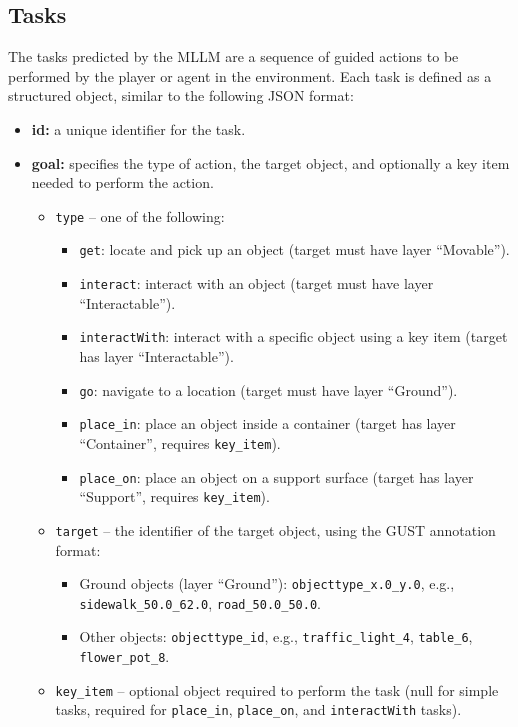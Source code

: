 \documentclass{article}
\begin{document}
\subsection{Tasks}

The tasks predicted by the MLLM are a sequence of guided actions to be performed by the player or agent in the environment. Each task is defined as a structured object, similar to the following JSON format:

\begin{itemize}
    \item \textbf{id:} a unique identifier for the task.
    
    \item \textbf{goal:} specifies the type of action, the target object, and optionally a key item needed to perform the action.
    \begin{itemize}
        \item \texttt{type} -- one of the following:
        \begin{itemize}
            \item \texttt{get}: locate and pick up an object (target must have layer ``Movable'').
            \item \texttt{interact}: interact with an object (target must have layer ``Interactable'').
            \item \texttt{interactWith}: interact with a specific object using a key item (target has layer ``Interactable'').
            \item \texttt{go}: navigate to a location (target must have layer ``Ground'').
            \item \texttt{place\_in}: place an object inside a container (target has layer ``Container'', requires \texttt{key\_item}).
            \item \texttt{place\_on}: place an object on a support surface (target has layer ``Support'', requires \texttt{key\_item}).
        \end{itemize}
        \item \texttt{target} -- the identifier of the target object, using the GUST annotation format:
        \begin{itemize}
            \item Ground objects (layer ``Ground''): \texttt{objecttype\_x.0\_y.0}, e.g., \texttt{sidewalk\_50.0\_62.0}, \texttt{road\_50.0\_50.0}.
            \item Other objects: \texttt{objecttype\_id}, e.g., \texttt{traffic\_light\_4}, \texttt{table\_6}, \texttt{flower\_pot\_8}.
        \end{itemize}
        \item \texttt{key\_item} -- optional object required to perform the task (null for simple tasks, required for \texttt{place\_in}, \texttt{place\_on}, and \texttt{interactWith} tasks).
    \end{itemize}
    

\end{itemize}
\end{document}
